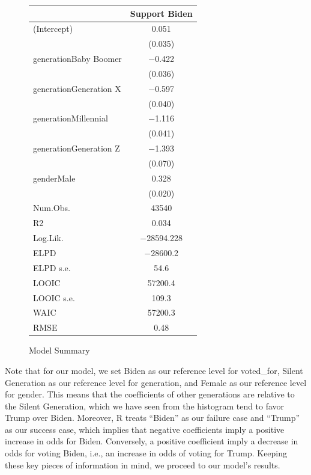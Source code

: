 \documentclass[
  letterpaper,
  DIV=11,
  numbers=noendperiod]{scrartcl}
\begin{document}
\begin{figure}

{\centering 

\hypertarget{fig-model-summary-1}{}
\begin{table}
\centering
\begin{tabular}[t]{lc}
\toprule
  & Support Biden\\
\midrule
(Intercept) & \num{0.051}\\
 & (\num{0.035})\\
generationBaby Boomer & \num{-0.422}\\
 & (\num{0.036})\\
generationGeneration X & \num{-0.597}\\
 & (\num{0.040})\\
generationMillennial & \num{-1.116}\\
 & (\num{0.041})\\
generationGeneration Z & \num{-1.393}\\
 & (\num{0.070})\\
genderMale & \num{0.328}\\
 & (\num{0.020})\\
\midrule
Num.Obs. & \num{43540}\\
R2 & \num{0.034}\\
Log.Lik. & \num{-28594.228}\\
ELPD & \num{-28600.2}\\
ELPD s.e. & \num{54.6}\\
LOOIC & \num{57200.4}\\
LOOIC s.e. & \num{109.3}\\
WAIC & \num{57200.3}\\
RMSE & \num{0.48}\\
\bottomrule
\end{tabular}
\end{table}

}

\caption{\label{fig-model-summary}Model Summary}

\end{figure}

Note that for our model, we set Biden as our reference level for
voted\_for, Silent Generation as our reference level for generation, and
Female as our reference level for gender. This means that the
coefficients of other generations are relative to the Silent Generation,
which we have seen from the histogram tend to favor Trump over Biden.
Moreover, R treats ``Biden'' as our failure case and ``Trump'' as our
success case, which implies that negative coefficients imply a positive
increase in odds for Biden. Conversely, a positive coefficient imply a
decrease in odds for voting Biden, i.e., an increase in odds of voting
for Trump. Keeping these key pieces of information in mind, we proceed
to our model's results.
\end{document}
